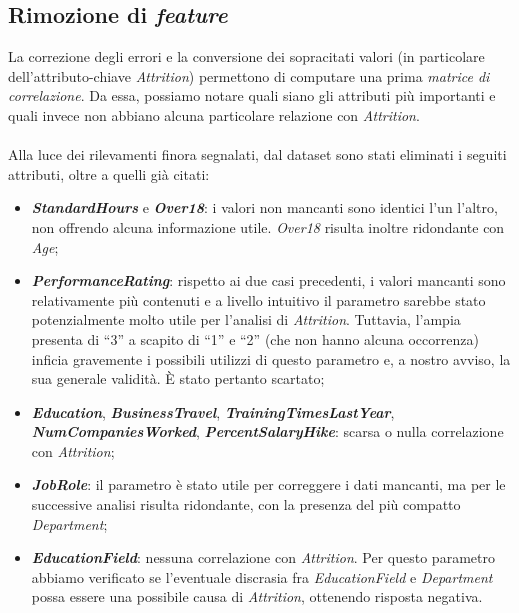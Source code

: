 \subsection{Rimozione di \textit{\textit{feature}}}
La correzione degli errori e la conversione dei sopracitati valori (in particolare dell'attributo-chiave \textit{Attrition}) permettono di computare una prima \textit{matrice di correlazione}. Da essa, possiamo notare quali siano gli attributi più importanti e quali invece non abbiano alcuna particolare relazione con \textit{Attrition}. \\\\
Alla luce dei rilevamenti finora segnalati, dal dataset sono stati eliminati i seguiti attributi, oltre a quelli già citati:
\begin{itemize}
    \itemsep0em
    \item \textit{\textbf{StandardHours}} e \textbf{\textit{Over18}}: i valori non mancanti sono identici l’un l’altro, non offrendo alcuna informazione utile. \textit{Over18} risulta inoltre ridondante con \textit{Age};
    \item \textbf{\textit{PerformanceRating}}: rispetto ai due casi precedenti, i valori mancanti sono relativamente più contenuti e a livello intuitivo il parametro sarebbe stato potenzialmente molto utile per l’analisi di \textit{Attrition}. Tuttavia, l’ampia presenta di “3” a scapito di “1” e “2” (che non hanno alcuna occorrenza) inficia gravemente i possibili utilizzi di questo parametro e, a nostro avviso, la sua generale validità. È stato pertanto scartato;
    \item \textbf{\textit{Education}}, \textit{\textbf{BusinessTravel}}, \textit{\textbf{TrainingTimesLastYear}}, \textit{\textbf{NumCompaniesWorked}}, \textit{\textbf{PercentSalaryHike}}: scarsa o nulla correlazione con \textit{Attrition};
    \item \textit{\textbf{JobRole}}: il parametro è stato utile per correggere i dati mancanti, ma per le successive analisi risulta ridondante, con la presenza del più compatto \textit{Department};
    \item	\textbf{\textit{EducationField}}: nessuna correlazione con \textit{Attrition}. Per questo parametro abbiamo verificato se l’eventuale discrasia fra \textit{EducationField} e \textit{Department} possa essere una possibile causa di \textit{Attrition}, ottenendo risposta negativa. %
\end{itemize}
